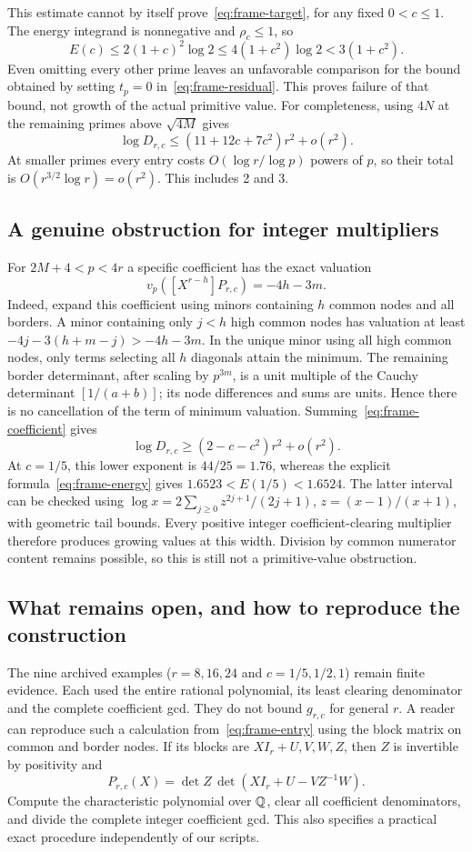 This estimate cannot by itself prove~\eqref{eq:frame-target}, for any
fixed $0<c\leq1$. The energy integrand is nonnegative and
$\rho_c\leq1$, so
\begin{equation}\label{eq:frame-gap}
 E(c)\leq2(1+c)^2\log2
       \leq4(1+c^2)\log2<3(1+c^2).
\end{equation}
Even omitting every other prime leaves an unfavorable comparison for
the bound obtained by setting $t_p=0$ in~\eqref{eq:frame-residual}.
This proves failure of that bound, not growth of the actual primitive value.
For completeness, using $4N$ at the remaining primes above $\sqrt{4M}$
gives
\[
 \log D_{r,c}\leq(11+12c+7c^2)r^2+o(r^2).
\]
At smaller primes every entry costs $O(\log r/\log p)$ powers of $p$,
so their total is $O(r^{3/2}\log r)=o(r^2)$. This includes 2 and 3.

\subsection{A genuine obstruction for integer multipliers}
For $2M+4<p<4r$ a specific coefficient has the exact valuation
\begin{equation}\label{eq:frame-coefficient}
 v_p([X^{r-h}]P_{r,c})=-4h-3m.
\end{equation}
Indeed, expand this coefficient using minors containing $h$ common
nodes and all borders. A minor containing only $j<h$ high common nodes
has valuation at least $-4j-3(h+m-j)>-4h-3m$.
In the unique minor using all high common nodes, only terms selecting
all $h$ diagonals attain the minimum. The remaining border determinant,
after scaling by $p^{3m}$, is a unit multiple of the Cauchy determinant
$[1/(a+b)]$; its node differences and sums are units. Hence there
is no cancellation of the term of minimum valuation.
Summing~\eqref{eq:frame-coefficient} gives
\[
 \log D_{r,c}\geq(2-c-c^2)r^2+o(r^2).
\]
At $c=1/5$, this lower exponent is $44/25=1.76$, whereas the explicit
formula~\eqref{eq:frame-energy} gives $1.6523<E(1/5)<1.6524$.
The latter interval can be checked using
$\log x=2\sum_{j\geq0}z^{2j+1}/(2j+1)$, $z=(x-1)/(x+1)$,
with geometric tail bounds. Every positive integer coefficient-clearing
multiplier therefore produces growing values at this width.
Division by common numerator content remains possible, so this is
still not a primitive-value obstruction.

\subsection{What remains open, and how to reproduce the construction}
The nine archived examples ($r=8,16,24$ and $c=1/5,1/2,1$) remain
finite evidence. Each used the entire rational polynomial, its least
clearing denominator and the complete coefficient gcd. They do not
bound $g_{r,c}$ for general $r$.
A reader can reproduce such a calculation from~\eqref{eq:frame-entry}
using the block matrix on common and border nodes. If its blocks are
$XI_r+U,V,W,Z$, then $Z$ is invertible by positivity and
\[
 P_{r,c}(X)=\det Z\,\det(XI_r+U-VZ^{-1}W).
\]
Compute the characteristic polynomial over $\mathbb Q$, clear all coefficient
denominators, and divide the complete integer coefficient gcd.
This also specifies a practical exact procedure independently of our scripts.

